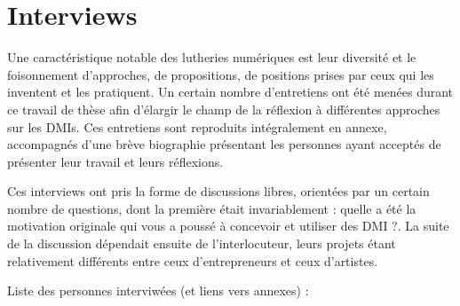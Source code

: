 \section{Interviews}

Une caractéristique notable des lutheries numériques est leur diversité et le foisonnement d'approches, de propositions, de positions prises par ceux qui les inventent et les pratiquent. Un certain nombre d'entretiens ont été menées durant ce travail de thèse afin d'élargir le champ de la réflexion à différentes approches sur les \glspl{DMI}. Ces entretiens sont reproduits intégralement en annexe, accompagnés d'une brève biographie présentant les personnes ayant acceptés de présenter leur travail et leurs réflexions.

Ces interviews ont pris la forme de discussions libres, orientées par un certain nombre de questions, dont la première était invariablement : quelle a été la motivation originale qui vous a poussé à concevoir et utiliser des DMI ?. La suite de la discussion dépendait ensuite de l'interlocuteur, leurs projets étant relativement différents entre ceux d'entrepreneurs et ceux d'artistes. %


Liste des personnes interviwées (et liens vers annexes) :

